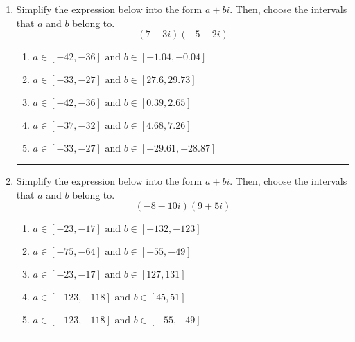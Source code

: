\documentclass[14pt]{extbook}
\newcommand{\litem}[1]{\item#1\hspace*{-1cm}\rule{\textwidth}{0.4pt}}
\begin{document}
\begin{enumerate}
{\begin{enumerate}[label=\Alph*.]
\end{enumerate} }
\litem{
Simplify the expression below into the form $a+bi$. Then, choose the intervals that $a$ and $b$ belong to.\[ (7 - 3 i)(-5 - 2 i) \]\begin{enumerate}[label=\Alph*.]
\item \( a \in [-42, -36] \text{ and } b \in [-1.04, -0.04] \)
\item \( a \in [-33, -27] \text{ and } b \in [27.6, 29.73] \)
\item \( a \in [-42, -36] \text{ and } b \in [0.39, 2.65] \)
\item \( a \in [-37, -32] \text{ and } b \in [4.68, 7.26] \)
\item \( a \in [-33, -27] \text{ and } b \in [-29.61, -28.87] \)

\end{enumerate} }
\litem{
Simplify the expression below into the form $a+bi$. Then, choose the intervals that $a$ and $b$ belong to.\[ (-8 - 10 i)(9 + 5 i) \]\begin{enumerate}[label=\Alph*.]
\item \( a \in [-23, -17] \text{ and } b \in [-132, -123] \)
\item \( a \in [-75, -64] \text{ and } b \in [-55, -49] \)
\item \( a \in [-23, -17] \text{ and } b \in [127, 131] \)
\item \( a \in [-123, -118] \text{ and } b \in [45, 51] \)
\item \( a \in [-123, -118] \text{ and } b \in [-55, -49] \)

\end{enumerate} }
\end{enumerate}
\end{document}
